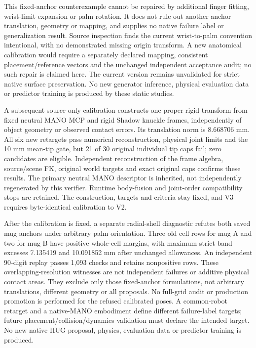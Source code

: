 This fixed-anchor counterexample cannot be repaired by additional finger
fitting, wrist-limit expansion or palm rotation. It does not rule out another
anchor translation, geometry or mapping, and supplies no native failure label
or generalization result. Source inspection finds the current wrist-to-palm
convention intentional, with no demonstrated missing origin transform. A new
anatomical calibration would require a separately declared mapping, consistent
placement/reference vectors and the unchanged independent acceptance audit;
no such repair is claimed here. The current version remains unvalidated for
strict native surface preservation. No new generator inference, physical
evaluation data or predictor training is produced by these static studies.

A subsequent source-only calibration constructs one proper rigid transform
from fixed neutral MANO MCP and rigid Shadow knuckle frames, independently
of object geometry or observed contact errors. Its translation norm is
8.668706 mm. All six new retargets pass numerical reconstruction, physical
joint limits and the 10 mm mean-tip gate, but 21 of 30 original individual
tip caps fail; zero candidates are eligible. Independent reconstruction of
the frame algebra, source/scene FK, original world targets and exact original
caps confirms these results. The primary neutral MANO descriptor is inherited,
not independently regenerated by this verifier. Runtime body-fusion and
joint-order compatibility stops are retained. The construction, targets and
criteria stay fixed, and V3 requires byte-identical calibration to V2.

After the calibration is fixed, a separate radial-shell diagnostic refutes
both saved mug anchors under arbitrary palm orientation. Three old cell rows
for mug A and two for mug B have positive whole-cell margins, with maximum
strict band excesses 7.135419 and 10.091852 mm after unchanged allowances.
An independent 90-digit replay passes 1,093 checks and retains nonpositive
rows. These overlapping-resolution witnesses are not independent failures
or additive physical contact areas. They exclude only those fixed-anchor
formulations, not arbitrary translations, different geometry or all proposals.
No full-grid audit or production promotion is performed for the refused
calibrated poses. A common-robot retarget and a native-MANO embodiment define
different failure-label targets; future placement/collision/dynamics validation
must declare the intended target. No new native HUG proposal, physics,
evaluation data or predictor training is produced.

